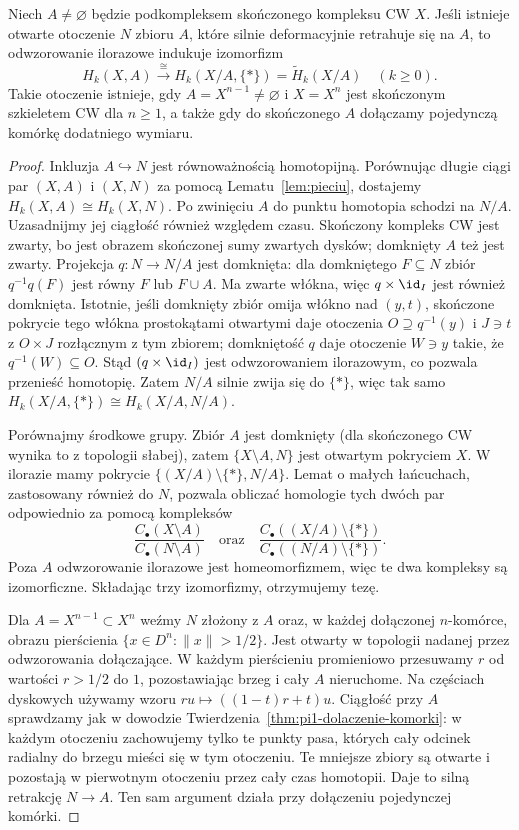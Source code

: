 \begin{lemat}
\label{lem:iloraz-cw-homologia}
Niech $A\ne\varnothing$ będzie podkompleksem skończonego
kompleksu CW $X$. Jeśli istnieje otwarte
otoczenie $N$ zbioru $A$, które silnie
deformacyjnie retrahuje się na $A$, to
odwzorowanie ilorazowe indukuje izomorfizm
\[
 H_k(X,A)\xrightarrow{\ \cong\ }
 H_k(X/A,\{*\})=\widetilde H_k(X/A)
 \quad(k\geq0).
\]
Takie otoczenie istnieje, gdy
$A=X^{n-1}\ne\varnothing$ i $X=X^n$ jest skończonym
szkieletem CW dla $n\geq1$, a także gdy do skończonego $A$
dołączamy pojedynczą komórkę dodatniego wymiaru.
\end{lemat}
\begin{proof}
Inkluzja $A\hookrightarrow N$ jest
równoważnością homotopijną. Porównując
długie ciągi par $(X,A)$ i $(X,N)$
za pomocą Lematu~\ref{lem:pieciu},
dostajemy $H_k(X,A)\cong H_k(X,N)$.
Po zwinięciu $A$ do punktu homotopia schodzi na $N/A$.
Uzasadnijmy jej ciągłość również względem czasu.
Skończony kompleks CW jest zwarty, bo jest obrazem skończonej
sumy zwartych dysków; domknięty $A$ też jest zwarty.
Projekcja $q:N\to N/A$ jest domknięta: dla domkniętego $F\subseteq N$
zbiór $q^{-1}q(F)$ jest równy $F$ lub $F\cup A$.
Ma zwarte włókna, więc $q\times\id_I$ jest również domknięta.
Istotnie, jeśli domknięty zbiór omija włókno nad $(y,t)$,
skończone pokrycie tego włókna prostokątami otwartymi daje
otoczenia $O\supseteq q^{-1}(y)$ i $J\ni t$ z $O\times J$
rozłącznym z tym zbiorem; domkniętość $q$ daje otoczenie
$W\ni y$ takie, że $q^{-1}(W)\subseteq O$.
Stąd $(q\times\id_I)$ jest odwzorowaniem ilorazowym,
co pozwala przenieść homotopię. Zatem $N/A$ silnie zwija się do $\{*\}$,
więc tak samo
$H_k(X/A,\{*\})\cong H_k(X/A,N/A)$.

Porównajmy środkowe grupy.
Zbiór $A$ jest domknięty
(dla skończonego CW wynika to
z topologii słabej), zatem
$\{X\setminus A,N\}$ jest
otwartym pokryciem $X$.
W ilorazie mamy pokrycie
$\{(X/A)\setminus\{*\},N/A\}$.
Lemat o małych łańcuchach,
zastosowany również do $N$,
pozwala obliczać homologie
tych dwóch par odpowiednio za pomocą kompleksów
\[
 \frac{C_\bullet(X\setminus A)}
      {C_\bullet(N\setminus A)}
 \quad\text{oraz}\quad
 \frac{C_\bullet((X/A)\setminus\{*\})}
      {C_\bullet((N/A)\setminus\{*\})}.
\]
Poza $A$ odwzorowanie ilorazowe jest
homeomorfizmem, więc te dwa
kompleksy są izomorficzne.
Składając trzy izomorfizmy,
otrzymujemy tezę.

Dla $A=X^{n-1}\subset X^n$
weźmy $N$ złożony z $A$ oraz,
w każdej dołączonej $n$-komórce,
obrazu pierścienia
$\{x\in D^n:\|x\|>1/2\}$.
Jest otwarty w topologii
nadanej przez odwzorowania dołączające.
W każdym pierścieniu promieniowo
przesuwamy $r$ od wartości
$r>1/2$ do $1$, pozostawiając
brzeg i cały $A$ nieruchome.
Na częściach dyskowych używamy wzoru
$ru\mapsto((1-t)r+t)u$. Ciągłość przy $A$ sprawdzamy jak
w dowodzie Twierdzenia~\ref{thm:pi1-dolaczenie-komorki}:
w każdym otoczeniu zachowujemy tylko te punkty pasa, których
cały odcinek radialny do brzegu mieści się w tym otoczeniu.
Te mniejsze zbiory są otwarte i pozostają w pierwotnym otoczeniu
przez cały czas homotopii. Daje to silną retrakcję $N\to A$.
Ten sam argument działa przy dołączeniu pojedynczej komórki.
\end{proof}


